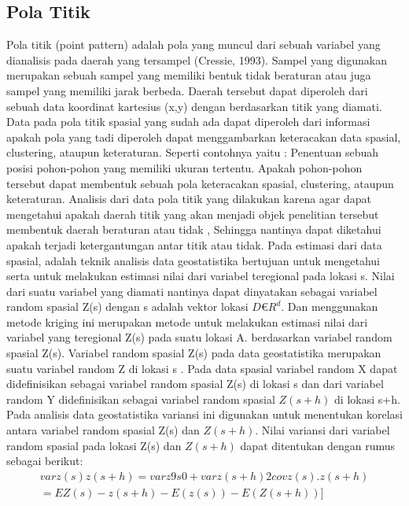 \subsection{Pola Titik}
	Pola titik (point pattern) adalah pola yang muncul dari sebuah variabel yang dianalisis pada daerah yang tersampel (Cressie, 1993). Sampel yang digunakan merupakan sebuah sampel yang memiliki bentuk tidak beraturan atau juga sampel yang memiliki jarak berbeda. Daerah tersebut dapat diperoleh dari sebuah data koordinat kartesius (x,y) dengan berdasarkan titik yang diamati. Data pada pola titik spasial yang sudah ada dapat diperoleh dari informasi apakah pola yang tadi diperoleh dapat menggambarkan keteracakan data spasial, clustering, ataupun keteraturan. Seperti contohnya yaitu : Penentuan sebuah posisi pohon-pohon yang memiliki ukuran tertentu. Apakah pohon-pohon tersebut dapat membentuk sebuah pola keteracakan spasial, clustering, ataupun keteraturan. Analisis dari data pola titik yang dilakukan karena agar dapat mengetahui apakah daerah titik yang akan menjadi objek penelitian tersebut membentuk daerah beraturan atau tidak , Sehingga nantinya dapat diketahui apakah terjadi ketergantungan antar titik atau tidak.   
	Pada estimasi dari data spasial, adalah teknik analisis data geostatistika bertujuan untuk mengetahui serta untuk melakukan estimasi nilai dari variabel teregional pada lokasi s. Nilai dari suatu variabel yang diamati nantinya dapat dinyatakan sebagai variabel random spasial  Z(s) dengan s adalah vektor lokasi $D € R^d$. Dan menggunakan metode kriging ini merupakan metode untuk melakukan estimasi nilai dari variabel yang teregional Z(s) pada suatu lokasi  A. berdasarkan variabel random spasial Z(s). Variabel random spasial  Z(s) pada data geostatistika merupakan suatu variabel random  Z di lokasi s . 
	Pada data spasial variabel random X dapat didefinisikan sebagai variabel random spasial Z(s) di lokasi  s dan dari variabel random Y didefinisikan sebagai variabel random spasial  $Z(s+h)$ di lokasi s+h. Pada analisis data geostatistika variansi ini digunakan untuk menentukan korelasi antara variabel random spasial Z(s) dan $Z(s+h)$. Nilai variansi dari variabel random spasial pada lokasi Z(s) dan $Z(s+h)$ dapat ditentukan dengan rumus sebagai berikut:
\begin{equation}
	\begin{split}
	var{z(s)  z(s+h)} = var{z9s0} + var{z(s+h)} 2cov{z(s).z(s+h)} \\
			    = E{Z(s)-z(s+h)}-{{E(z(s))-E(Z(s+h))}]}
			\end{split}
\end{equation}

